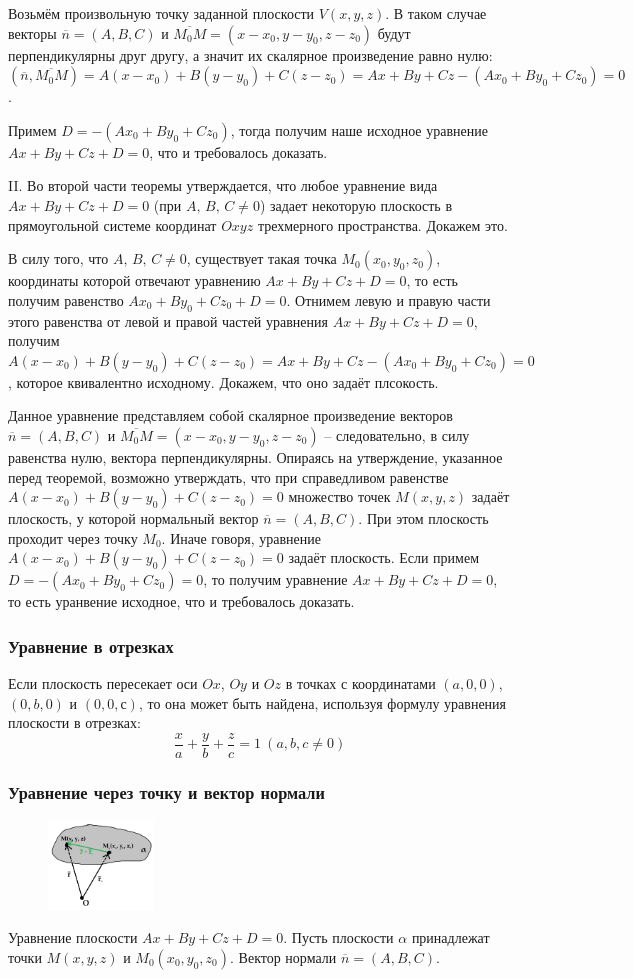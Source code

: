 \documentclass{article}
\begin{document}
Возьмём произвольную точку заданной плоскости $V(x,y,z)$. В таком случае векторы $\overline{n}=(A,B,C)$ и $\overline{M_0M}=(x-x_0,y-y_0,z-z_0)$ будут перпендикулярны друг другу, а значит их скалярное произведение равно нулю: $(\overline{n},\overline{M_0M})=A(x-x_0)+B(y-y_0)+C(z-z_0)=Ax+By+Cz-(Ax_0+By_0+Cz_0)=0$.

Примем $D=-(Ax_0+By_0+Cz_0)$, тогда получим наше исходное уравнение $Ax+By+Cz+D=0$, что и требовалось доказать.

\newpage

II. Во второй части теоремы утверждается, что любое уравнение вида $Ax+By+Cz+D=0$ (при $A,\,B,\,C\neq 0$)
 задает некоторую плоскость в прямоугольной системе координат $Oxyz$
 трехмерного пространства. Докажем это.

В силу того, что $A,\,B,\,C\neq 0$, существует такая точка $M_0(x_0,y_0,z_0)$, координаты которой отвечают уравнению $Ax+By+Cz+D=0$, то есть получим равенство $Ax_0+By_0+Cz_0+D=0$. Отнимем левую и правую части этого равенства от левой и правой частей уравнения $Ax+By+Cz+D=0$, получим $A(x-x_0)+B(y-y_0)+C(z-z_0)=Ax+By+Cz-(Ax_0+By_0+Cz_0)=0$, которое квивалентно исходному. Докажем, что оно задаёт плсокость.

Данное уравнение представляем собой скалярное произведение векторов $\overline{n}=(A,B,C)$ и $\overline{M_0M}=(x-x_0,y-y_0,z-z_0)$ -- следовательно, в силу равенства нулю, вектора перпендикулярны. Опираясь на утверждение, указанное перед теоремой, возможно утверждать, что при справедливом равенстве $A(x-x_0)+B(y-y_0)+C(z-z_0)=0$ множество точек $M(x,y,z)$ задаёт плоскость, у которой нормальный вектор $\overline{n}=(A,B,C)$. При этом плоскость проходит через точку $M_0$. Иначе говоря, уравнение $A(x-x_0)+B(y-y_0)+C(z-z_0)=0$ задаёт плоскость. Если примем $D=-(Ax_0+By_0+Cz_0)=0$, то получим уравнение $Ax+By+Cz+D=0$, то есть уранвение исходное, что и требовалось доказать.
\subsubsection{Уравнение в отрезках}
Если плоскость пересекает оси $Ox$, $Oy$ и $Oz$ в точках с координатами $(a, 0, 0)$, $(0, b, 0)$ и $(0, 0, с)$, то она может быть найдена, используя формулу уравнения плоскости в отрезках:
$$ \frac{x}{a}+\frac{y}{b}+\frac{z}{c}=1\:(a,b,c\neq0) $$
\subsubsection{Уравнение через точку и вектор нормали}
\begin{figure}
    \centering
    \includegraphics[width=0.25\textwidth]{pic3.png}
\end{figure}
Уравнение плоскости $Ax+By+Cz+D=0$. Пусть плоскости $\alpha$ принадлежат точки $M(x,y,z)$ и $M_0(x_0,y_0,z_0)$. Вектор нормали $\overline{n}=(A,B,C)$.
\end{document}
